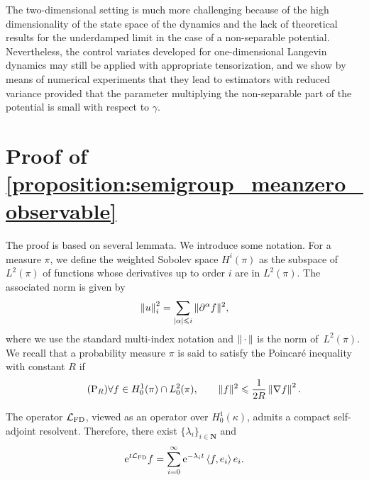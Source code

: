 \documentclass[11pt,a4paper]{article}
\newcommand{\e}{\mathrm{e}}
\newcommand{\dummy}{\,\cdot\,}
\newcommand{\nat}{\mathbf N}
\newcommand{\grad}{\nabla}
\theoremstyle{plain}
\numberwithin{equation}{section}
\renewcommand{\leq}{\leqslant}
\begin{document}
The two-dimensional setting is much more challenging because of the high dimensionality of the state space of the dynamics
and the lack of theoretical results for the underdamped limit in the case of a non-separable potential.
Nevertheless, the control variates developed for one-dimensional Langevin dynamics may still be applied with appropriate tensorization,
and we show by means of numerical experiments that
they lead to estimators with reduced variance provided that
the parameter multiplying the non-separable part of the potential is small with respect to $\gamma$.

\appendix
\section{Proof of \texorpdfstring{\cref{proposition:semigroup_meanzero_observable}}{Proposition 2.1}}%
\label{sec:auxiliary_technical_results}

The proof is based on several lemmata.
We introduce some notation.
For a measure $\pi$, we define the weighted Sobolev space $H^i(\pi)$ as the subspace of $L^2(\pi)$
of functions whose derivatives up to order $i$ are in $L^2(\pi)$.
The associated norm is given by
\[
    \norm{u}_i^2 = \sum_{|\alpha| \leq i} \norm*{\partial^{\alpha} f}^2,
\]
where we use the standard multi-index notation
and $\norm{\dummy}$ is the norm of~$L^2(\pi)$.
We recall that a probability measure $\pi$ is said to satisfy the Poincaré inequality with constant $R$ if
\begin{equation}
    \label{eq:poincare}
    \tag{P$_R$}
    \forall f \in H^1_0(\pi) \cap L^2_0(\pi), \qquad
    \norm*{f}^2 \leq \frac{1}{2R} \norm{\grad f}^2.
\end{equation}

The operator $\mathcal L_{\rm FD}$,
viewed as an operator over $H^1_0(\kappa)$,
admits a compact self-adjoint resolvent.
Therefore, there exist $\{\lambda_i\}_{i\in \nat}$ and
\[
    \e^{t \mathcal L_{\rm FD}} f
    = \sum_{i=0}^{\infty} \e^{- \lambda_i t} \ip{f}{e_i} e_i.
\]
\end{document}
